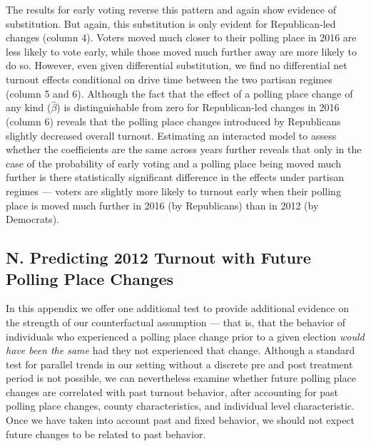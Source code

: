 \documentclass{cup_PSRM}
\begin{document}
The results for early voting reverse this pattern and again show evidence of substitution.  But again, this substitution is only evident for Republican-led changes (column 4).  Voters moved much closer to their polling place in 2016 are less likely to vote early, while those moved much further away are more likely to do so.  However, even given differential substitution, we find no differential net turnout effects conditional on drive time between the two partisan regimes (column 5 and 6).  Although the fact that the effect of a polling place change of any kind ($\hat{\beta}$) is distinguishable from zero for Republican-led changes in 2016 (column 6) reveals that the polling place changes introduced by Republicans slightly decreased overall turnout. Estimating an interacted model to assess whether the coefficients are the same across years further reveals that only in the case of the probability of early voting and a polling place being moved much further is there statistically significant difference in the effects under partisan regimes --- voters are slightly more likely to turnout early when their polling place is moved much further in 2016 (by Republicans) than in 2012 (by Democrats).





\clearpage \newpage
\subsection{N. Predicting 2012 Turnout with Future Polling Place Changes}\label{appendix_lead}
\setcounter{table}{0}
\setcounter{figure}{0}
\renewcommand{\thetable}{N\arabic{table}}
\renewcommand{\thefigure}{N\arabic{figure}}


\noindent In this appendix we offer one additional test to provide additional evidence on the strength of our counterfactual assumption --- that is, that the behavior of individuals who experienced a polling place change prior to a given election \emph{would have been the same} had they not experienced that change.  Although a standard test for parallel trends in our setting without a discrete pre and post treatment period is not possible, we can nevertheless examine whether future polling place changes are correlated with past turnout behavior, after accounting for past polling place changes, county characteristics, and individual level characteristic.  Once we have taken into account past and fixed behavior, we should not expect future changes to be related to past behavior.
\end{document}
